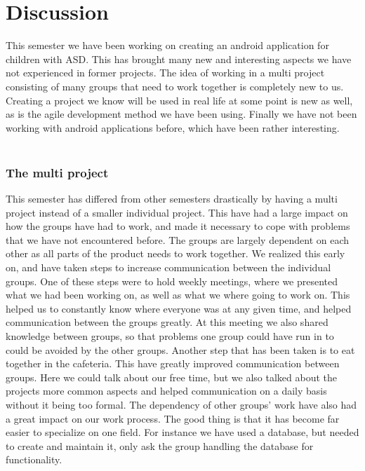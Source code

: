 \chapter{Discussion}
This semester we have been working on creating an android application for children with ASD. 
This has brought many new and interesting aspects we have not experienced in former projects. 
The idea of working in a multi project consisting of many groups that need to work together is completely new to us. 
Creating a project we know will be used in real life at some point is new as well, as is the agile development method we have been using. Finally we have not been working with android applications before, which have been rather interesting.\\ 
\\
\subsection*{The multi project}
This semester has differed from other semesters drastically by having a multi project instead of a smaller individual project. 
This have had a large impact on how the groups have had to work, and made it necessary to cope with problems that we have not encountered before.\newline
The groups are largely dependent on each other as all parts of the product needs to work together. 
We realized this early on, and have taken steps to increase communication between the individual groups. 
One of these steps were to hold weekly meetings, where we presented what we had been working on, as well as what we where going to work on.\newline 
This helped us to constantly know where everyone was at any given time, and helped communication between the groups greatly. 
At this meeting we also shared knowledge between groups, so that problems one group could have run in to could be avoided by the other groups.\newline
Another step that has been taken is to eat together in the cafeteria. This have greatly improved communication between groups. 
Here we could talk about our free time, but we also talked about the projects more common aspects and helped communication on a daily basis without it being too formal.\newline
The dependency of other groups' work have also had a great impact on our work process. 
The good thing is that it has become far easier to specialize on one field. 
For instance we have used a database, but needed to create and maintain it, only ask the group handling the database for functionality. 
